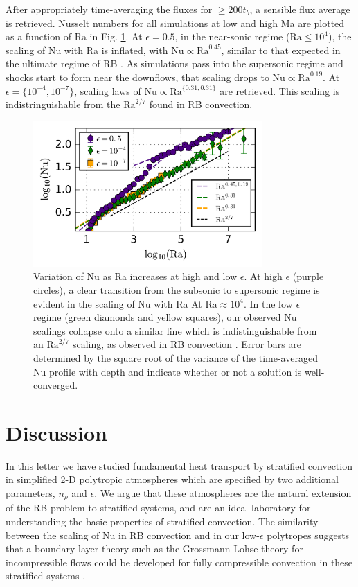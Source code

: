 \documentclass[aps, prl, twocolumn, nofootinbib, groupedaddress, amsfonts, amssymb, amsmath]{revtex4-1}
\newcommand{\nrho}{\ensuremath{n_{\rho}}}
\begin{document}
After appropriately time-averaging the fluxes for $\geq 200 t_b$, 
a sensible flux average is retrieved.  Nusselt numbers for
all simulations at low and high Ma are plotted as a function of Ra in Fig. \ref{fig:nu_v_ra}.  
At $\epsilon = 0.5$, in the near-sonic
regime ($\text{Ra} \leq 10^4$), the scaling of Nu with Ra is inflated,
with $\text{Nu} \propto \text{Ra}^{0.45}$, similar to that expected in the
ultimate regime of RB \cite{ahlers&all2009}.  As simulations
pass into the supersonic regime and shocks start to form near the downflows,
that scaling drops to $\text{Nu} \propto \text{Ra}^{0.19}$.  
At $\epsilon = \{10^{-4}, 10^{-7}\}$,
scaling laws of $\text{Nu} \propto \text{Ra}^{\{0.31, 0.31\}}$ are retrieved. 
This scaling is indistringuishable from the $\text{Ra}^{2/7}$ found in RB
convection.


\begin{figure}[t]
\includegraphics[width=3.4375in]{./figs/nu_v_ra.png}
\caption{Variation of Nu as Ra increases at high and low $\epsilon$. 
At high $\epsilon$ (purple circles), 
a clear transition from the subsonic to supersonic regime is evident in the scaling
of Nu with Ra At $\text{Ra} \approx 10^4$.  In the low $\epsilon$ regime (green diamonds and yellow squares), 
our observed Nu scalings collapse onto a similar line which is
indistinguishable from an $\text{Ra}^{2/7}$ scaling, 
as observed in RB convection \cite{johnston&doering2009}.  Error bars are determined
 by the square root of the variance of the time-averaged Nu profile with depth and 
 indicate whether or not a solution is well-converged.
\label{fig:nu_v_ra} }
\end{figure}

\section{Discussion}
\label{sec:discussion}
In this letter we have studied fundamental heat transport by 
stratified convection in simplified 2-D polytropic
atmospheres which are specified by two additional parameters, $\nrho$ 
and $\epsilon$.  We argue that these atmospheres are the natural extension
of the RB problem to stratified systems, 
and are an ideal laboratory for understanding the basic properties of stratified
convection.  The similarity between the scaling of Nu in RB 
convection and in our low-$\epsilon$ polytropes suggests 
that a boundary layer theory such as the Grossmann-Lohse theory for incompressible flows
could be developed for fully compressible 
convection in these stratified systems \cite{ahlers&all2009}.  
\end{document}
